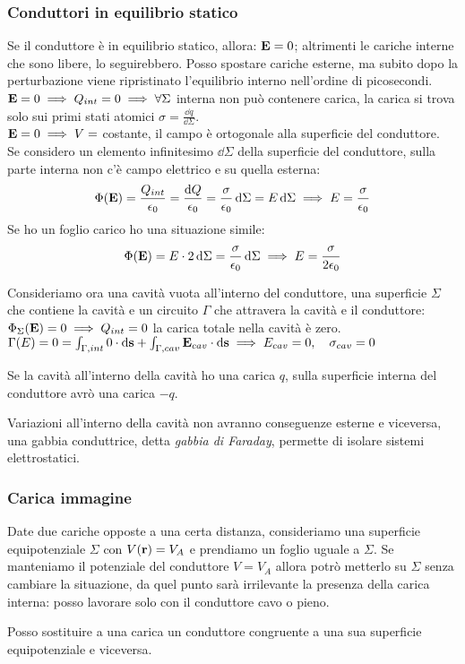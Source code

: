\documentclass[12pt,a4paper]{article}
\begin{document}
\subsubsection{Conduttori in equilibrio statico}
Se il conduttore è in equilibrio statico, allora: $\vb{E}=0$; altrimenti le cariche interne che sono libere, lo seguirebbero.
Posso spostare cariche esterne, ma subito dopo la perturbazione viene ripristinato l'equilibrio interno nell'ordine di picosecondi.
\\
$\vb{E}=0 \implies Q_{int} = 0\implies \forall\Sigma$ interna non può contenere carica, la carica si trova solo sui primi stati atomici
$\sigma= \frac{\dd{q}}{\dd{\Sigma}}$.
\\
$\vb{E}=0 \implies  V = $ costante, il campo è ortogonale alla superficie del conduttore. 
\\Se considero un elemento infinitesimo $\dd{\Sigma}$ della superficie del conduttore, sulla parte interna non c'è campo elettrico e su quella esterna:
\begin{equation*}
    \Phi(\vb{E})= \frac{Q_{int}}{\epsilon_0}= \frac{\dd{Q}}{\epsilon_0}= \frac{\sigma}{\epsilon_0}\dd{\Sigma}= E\dd{\Sigma}\implies E = \frac{\sigma}{\epsilon_0}
\end{equation*}
Se ho un foglio carico ho una situazione simile:
\begin{equation*}
    \Phi(\vb{E}) = E \cdot 2\dd{\Sigma}= \frac{\sigma}{\epsilon_0}\dd{\Sigma}\implies E = \frac{\sigma}{2\epsilon_0}
\end{equation*}

Consideriamo ora una cavità vuota all'interno del conduttore, una superficie $\Sigma $ che contiene la cavità  e un circuito $\Gamma$ che attravera la cavità e il conduttore:
\\$\Phi_\Sigma(\vb{E})= 0 \implies Q_{int} = 0 $ la carica totale nella cavità è zero.
\\$\Gamma(E)= 0 = \int_{\Gamma,int}0 \cdot\dd{\vb{s}}+\int_{\Gamma,cav}\vb{E}_{cav}\cdot\dd{\vb{s}}\implies E_{cav}= 0, \quad
\sigma_{cav}=0$

Se la cavità all'interno della cavità ho una carica $q$, sulla superficie interna del conduttore avrò una carica $-q$.

Variazioni all'interno della cavità non avranno conseguenze esterne e viceversa, una gabbia conduttrice, detta \textit{gabbia di Faraday},
permette di isolare sistemi elettrostatici.

\subsubsection{Carica immagine}
Date due cariche opposte a una certa distanza, consideriamo una superficie equipotenziale $\Sigma$ con $V(\vb{r})= V_A$ e prendiamo un foglio 
uguale a $\Sigma$. Se manteniamo il potenziale del conduttore $V = V_A$ allora potrò metterlo su $\Sigma$ senza cambiare la situazione, da quel
punto sarà irrilevante la presenza della carica interna: posso lavorare solo con il conduttore cavo o pieno.
\begin{proposition}
    Posso sostituire a una carica un conduttore congruente a una sua superficie equipotenziale e viceversa.
\end{proposition}
\end{document}
